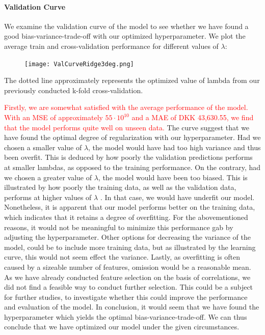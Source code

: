 \documentclass[12pt,a4paper]{article}
\begin{document}
\paragraph{Validation Curve}
We examine the validation curve of the model to see whether we have found a good bias-variance-trade-off with our optimized hyperparameter. We plot the average train and cross-validation performance for different values of $\lambda$: 
\begin{figure}[H]
\centering
\caption{}
\texttt{[image: ValCurveRidge3deg.png]}
\end{figure}
The dotted line approximately represents the optimized value of lambda from our previously conducted k-fold cross-validation. 

\textcolor{red}{Firstly, we are somewhat satisfied with the average performance of the model. With an MSE of approximately $55\cdot10^{10}$ and a MAE of DKK 43,630.55, we find that the model performs quite well on unseen data.} 
The curve suggest that we have found the optimal degree of regularization with our hyperparameter. Had we chosen a smaller value of $\lambda$, the model would have had too high variance and thus been overfit. This is deduced by how poorly the validation predictions performs at smaller lambdas, as opposed to the training performance. On the contrary, had we chosen a greater value of $\lambda$, the model would have been too biased. This is illustrated by how poorly the training data, as well as the validation data, performs at higher values of $\lambda$ . In that case, we would have underfit our model. 
Nonetheless, it is apparent that our model performs better on the training data, which indicates that it retains a degree of overfitting. For the abovementioned reasons, it would not be meaningful to minimize this performance gab by adjusting the hyperparameter. Other options for decreasing the variance of the model, could be to include more training data, but as illustrated by the learning curve, this would not seem effect the variance. Lastly, as overfitting is often caused by a sizeable number of features, omission would be a reasonable mean. As we have already conducted feature selection on the basis of correlations, we did not find a feasible way to conduct further selection. This could be a subject for further studies, to investigate whether this could improve the performance and evaluation of the model. \newline
In conclusion, it would seem that we have found the hyperparameter which yields the optimal bias-variance-trade-off. We can thus conclude that we have optimized our model under the given circumstances. 
\end{document}
